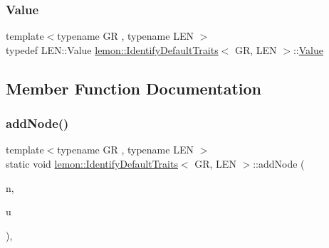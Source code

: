 \subsubsection{\texorpdfstring{Value}{Value}}
{\footnotesize\ttfamily template$<$typename GR , typename L\+EN $>$ \\
typedef L\+E\+N\+::\+Value \hyperlink{structlemon_1_1_identify_default_traits}{lemon\+::\+Identify\+Default\+Traits}$<$ GR, L\+EN $>$\+::\hyperlink{structlemon_1_1_identify_default_traits_ae44641190d3358bbe94ff53a18c36193}{Value}}



\subsection{Member Function Documentation}
\mbox{\label{structlemon_1_1_identify_default_traits_aa127d5835d6adf71c52ef3806d8d3e2d}} 
\subsubsection{\texorpdfstring{add\+Node()}{addNode()}}
{\footnotesize\ttfamily template$<$typename GR , typename L\+EN $>$ \\
static void \hyperlink{structlemon_1_1_identify_default_traits}{lemon\+::\+Identify\+Default\+Traits}$<$ GR, L\+EN $>$\+::add\+Node (\begin{DoxyParamCaption}\item[{\hyperlink{structlemon_1_1_identify_default_traits_ac7ceaa832e1553cd7fda8d3edc14023e}{Node\+List} \&}]{n,  }\item[{\hyperlink{structlemon_1_1_identify_default_traits_a8cd1d66e1f5de579d028a3b18561ea5a}{Node}}]{u }\end{DoxyParamCaption})\hspace{0.3cm}{\ttfamily [inline]}, {\ttfamily [static]}}

\mbox{\label{structlemon_1_1_identify_default_traits_a28654afa585a6b293ebd0afaf78b4411}} 
